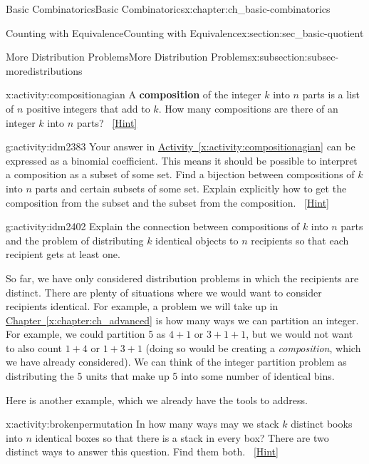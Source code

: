 \documentclass[oneside,10pt,]{book}
\newcommand{\terminology}[1]{\textbf{#1}}
\numberwithin{equation}{chapter}
\begin{document}
\begin{chapterptx}{Basic Combinatorics}{}{Basic Combinatorics}{}{}{x:chapter:ch_basic-combinatorics}
\begin{sectionptx}{Counting with Equivalence}{}{Counting with Equivalence}{}{}{x:section:sec_basic-quotient}
\begin{subsectionptx}{More Distribution Problems}{}{More Distribution Problems}{}{}{x:subsection:subsec-moredistributions}
\begin{activity}{}{x:activity:compositionagian}%
A \terminology{composition} of the integer \(k\) into \(n\) parts is a list of \(n\) positive integers that add to \(k\).  How many compositions are there of an integer \(k\) into \(n\) parts?%
\qquad~\hfill{\tiny\hyperlink{g:hint:idm2370-back}{[Hint]}}\end{activity}
\begin{activity}{}{g:activity:idm2383}%
Your answer in \hyperref[x:activity:compositionagian]{Activity~\ref{x:activity:compositionagian}} can be expressed as a binomial coefficient. This means it should be possible to interpret a composition as a subset of some set. Find a bijection between compositions of \(k\) into \(n\) parts and certain subsets of some set.  Explain explicitly how to get the composition from the subset and the subset from the composition.%
\qquad~\hfill{\tiny\hyperlink{g:hint:idm2389-back}{[Hint]}}\end{activity}
\begin{activity}{}{g:activity:idm2402}%
Explain the connection between compositions of \(k\) into \(n\) parts and the problem of distributing \(k\) identical objects to \(n\) recipients so that each recipient gets at least one.%
\end{activity}
So far, we have only considered distribution problems in which the recipients are distinct.  There are plenty of situations where we would want to consider recipients identical.  For example, a problem we will take up in \hyperref[x:chapter:ch_advanced]{Chapter~\ref{x:chapter:ch_advanced}} is how many ways we can partition an integer.  For example, we could partition 5 as \(4+1\) or \(3+1+1\), but we would not want to also count \(1+4\) or \(1+3+1\) (doing so would be creating a \emph{composition}, which we have already considered).  We can think of the integer partition problem as distributing the 5 units that make up 5 into some number of identical bins.%
\par
Here is another example, which we already have the tools to address.%
\begin{activity}{}{x:activity:brokenpermutation}%
In how many ways may we stack \(k\) distinct books into \(n\) identical boxes so that there is a stack in every box? There are two distinct ways to answer this question.  Find them both.%
\qquad~\hfill{\tiny\hyperlink{g:hint:idm2428-back}{[Hint]}}\end{activity}

\end{subsectionptx}
\end{sectionptx}
\end{chapterptx}
\end{document}
